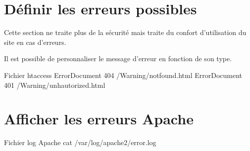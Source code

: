 \section{Définir les erreurs possibles}

Cette section ne traite plus de la sécurité mais traite du confort d’utilisation du site en cas d’erreurs.

Il est possible de personnaliser le message d’erreur en fonction de son type.

\begin{Bash}{Fichier htaccess}
ErrorDocument 404 /Warning/notfound.html
ErrorDocument 401 /Warning/unhautorized.html
\end{Bash}

\section{Afficher les erreurs Apache}
\begin{Bash}{Fichier log Apache}
cat /var/log/apache2/error.log 
\end{Bash}
